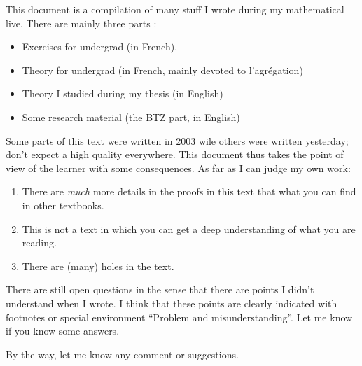 
This document is a compilation of many stuff I wrote during my mathematical live. There are mainly three parts :
\begin{itemize}
    \item Exercises for undergrad (in French).
    \item Theory for undergrad (in French, mainly devoted to l'agrégation)
    \item Theory I studied during my thesis (in English)
    \item Some research material (the BTZ part, in English)
\end{itemize}
Some parts of this text were written in 2003 wile others were written yesterday; don't expect a high quality everywhere. This document thus takes the point of view of the learner with some consequences. As far as I can judge my own work:
\begin{enumerate}
    \item
        There are \emph{much} more details in the proofs in this text that what you can find in other textbooks.
    \item
        This is not a text in which you can get a deep understanding of what you are reading.
    \item
        There are (many) holes in the text.
\end{enumerate}

There are still open questions in the sense that there are points I didn't understand when I wrote. I think that these points are clearly indicated with footnotes or special environment ``Problem and misunderstanding''. Let me know if you know some answers.

By the way, let me know any comment or suggestions.
